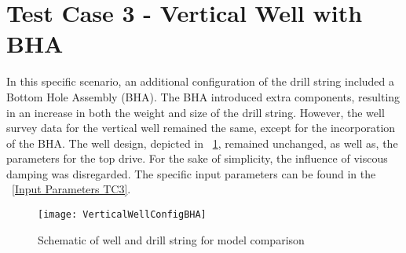 % 
%
%

\section{Test Case 3 - Vertical Well with BHA}

In this specific scenario, an additional configuration of the drill string included a Bottom Hole Assembly (BHA). The BHA introduced extra components, resulting in an increase in both the weight and size of the drill string. However, the well survey data for the vertical well remained the same, except for the incorporation of the BHA. The well design, depicted in \figurename~\ref{Vert_well_conf_BHA}, remained unchanged, as well as, the parameters for the top drive. For the sake of simplicity, the influence of viscous damping was disregarded. The specific input parameters can be found in the \tablename~\ref{Input Parameters TC3}.

\begin{figure}[!hbt]
  \centering
  \texttt{[image: VerticalWellConfigBHA]}
  \caption{Schematic of well and drill string for model comparison}\label{Vert_well_conf_BHA}
\end{figure}


